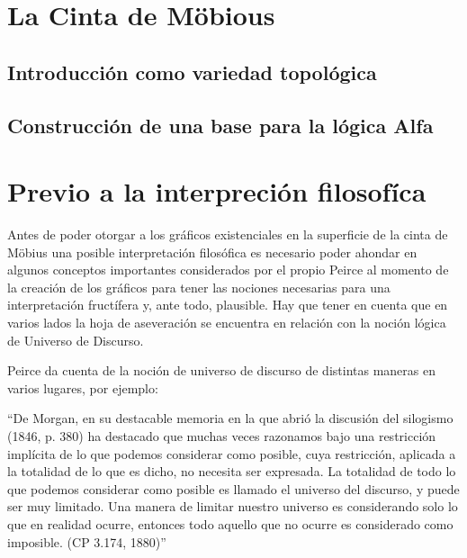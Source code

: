 \documentclass[
	fontsize=10pt, %
	twoside=false, %
	secnumdepth=1, %
	abstract=true, %
]{kaohandt}
\begin{document}
\section{La Cinta de Möbious} %
\label{sec:La Cinta de Möbius}

\subsection{Introducción como variedad topológica}


\subsection{Construcción de una base para la lógica Alfa}


\section{Previo a la interpreción filosofíca} %
\label{sec:Previo a la interpreción filosofíca}

Antes de poder otorgar a los gráficos existenciales en la superficie de la cinta de Möbius una posible interpretación filosófica es necesario poder ahondar en algunos conceptos importantes considerados por el propio Peirce al momento de la creación de los gráficos para tener las nociones necesarias para una interpretación fructífera y, ante todo, plausible. Hay que tener en cuenta que en varios lados la hoja de aseveración se encuentra en relación con la noción lógica de Universo de Discurso.

Peirce da cuenta de la noción de universo de discurso de distintas maneras en varios lugares, por ejemplo:

\enquote{De Morgan, en su destacable memoria en la que abrió la discusión del silogismo (1846, p. 380) ha destacado que muchas veces razonamos bajo una restricción implícita de lo que podemos considerar como posible, cuya restricción, aplicada a la totalidad de lo que es dicho, no necesita ser expresada. La totalidad de todo lo que podemos considerar como posible es llamado el universo del discurso, y puede ser muy limitado. Una manera de limitar nuestro universo es considerando solo lo que en realidad ocurre, entonces todo aquello que no ocurre es considerado como imposible. (CP 3.174, 1880)}
\end{document}

